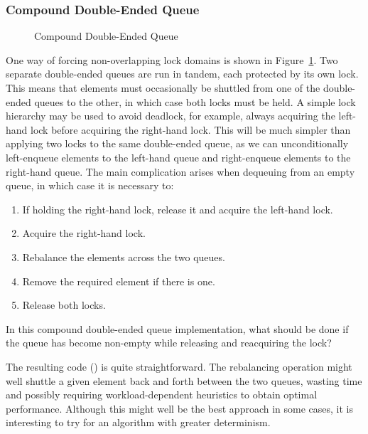 \subsubsection{Compound Double-Ended Queue}
\label{sec:SMPdesign:Compound Double-Ended Queue}

\begin{figure}[tb]
\centering
{}
\caption{Compound Double-Ended Queue}
\label{fig:SMPdesign:Compound Double-Ended Queue}
\end{figure}

One way of forcing non-overlapping lock domains is shown in
Figure~\ref{fig:SMPdesign:Compound Double-Ended Queue}.
Two separate double-ended queues are run in tandem, each protected by
its own lock.
This means that elements must occasionally be shuttled from one of
the double-ended queues to the other, in which case both locks must
be held.
A simple lock hierarchy may be used to avoid deadlock, for example,
always acquiring the left-hand lock before acquiring the right-hand lock.
This will be much simpler than applying two locks to the same
double-ended queue, as we can unconditionally left-enqueue elements
to the left-hand queue and right-enqueue elements to the right-hand
queue.
The main complication arises when dequeuing from an empty queue, in
which case it is necessary to:

\begin{enumerate}
\item	If holding the right-hand lock, release it and acquire the
	left-hand lock.
\item	Acquire the right-hand lock.
\item	Rebalance the elements across the two queues.
\item	Remove the required element if there is one.
\item	Release both locks.
\end{enumerate}

\QuickQuiz{}
	In this compound double-ended queue implementation, what should
	be done if the queue has become non-empty while releasing
	and reacquiring the lock?
 \QuickQuizEnd

The resulting code () is quite straightforward.
The rebalancing operation might well shuttle a given element back
and forth between the two queues, wasting time and possibly requiring
workload-dependent heuristics to obtain optimal performance.
Although this might well be the best approach in some cases, it is
interesting to try for an algorithm with greater determinism.


